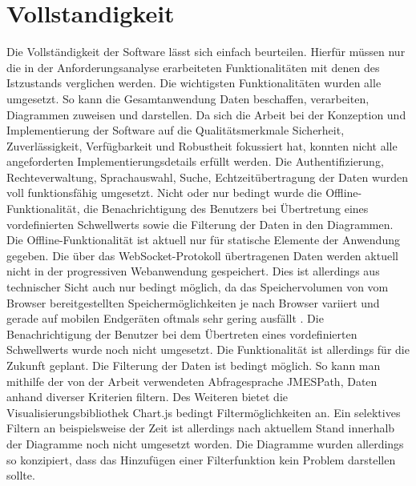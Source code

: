 \section{Vollstandigkeit}
\label{sec:vollstaendigkeit}
Die Vollständigkeit der Software lässt sich einfach beurteilen. Hierfür müssen nur die in der Anforderungsanalyse
erarbeiteten Funktionalitäten mit denen des Istzustands verglichen werden. Die wichtigsten Funktionalitäten
wurden alle umgesetzt. So kann die Gesamtanwendung Daten beschaffen, verarbeiten, Diagrammen zuweisen und darstellen.
Da sich die Arbeit bei der Konzeption und Implementierung der Software auf die Qualitätsmerkmale Sicherheit,
Zuverlässigkeit, Verfügbarkeit und Robustheit fokussiert hat, konnten nicht alle angeforderten Implementierungsdetails
erfüllt werden. Die Authentifizierung, Rechteverwaltung, Sprachauswahl, Suche, Echtzeitübertragung der Daten wurden
voll funktionsfähig umgesetzt. Nicht oder nur bedingt wurde die Offline-Funktionalität, die Benachrichtigung
des Benutzers bei Übertretung eines vordefinierten Schwellwerts sowie die Filterung der Daten in den Diagrammen.
Die Offline-Funktionalität ist aktuell nur für statische Elemente der Anwendung gegeben. Die über das WebSocket-Protokoll
übertragenen Daten werden aktuell nicht in der progressiven Webanwendung gespeichert. Dies ist allerdings aus technischer
Sicht auch nur bedingt möglich, da das Speichervolumen von vom Browser bereitgestellten Speichermöglichkeiten
je nach Browser variiert und gerade auf mobilen Endgeräten oftmals sehr gering ausfällt \cite{HTML5RocksStorage}.
Die Benachrichtigung der Benutzer bei dem Übertreten eines vordefinierten Schwellwerts wurde noch nicht umgesetzt.
Die Funktionalität ist allerdings für die Zukunft geplant. Die Filterung der Daten ist bedingt möglich. So kann 
man mithilfe der von der Arbeit verwendeten Abfragesprache JMESPath, Daten anhand diverser Kriterien filtern.
Des Weiteren bietet die Visualisierungsbibliothek Chart.js bedingt Filtermöglichkeiten an. Ein selektives Filtern
an beispielsweise der Zeit ist allerdings nach aktuellem Stand innerhalb der Diagramme noch nicht umgesetzt worden.
Die Diagramme wurden allerdings so konzipiert, dass das Hinzufügen einer Filterfunktion
kein Problem darstellen sollte.

